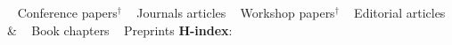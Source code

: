 


\setcounter{nC}{79}  %
\setcounter{nJ}{15}  %
\setcounter{nW}{33}  %
\setcounter{nBc}{5}  %
\setcounter{nE}{4}  %
\setcounter{nB}{2}  %
\setcounter{nP}{20}  %

\newcommand{\realcount}[1]{%
  \number\numexpr\value{#1}-1\relax%
}
\newcommand{\decvalue}[1]{%
  \addtocounter{#1}{-1}%
  \number\value{#1}%
}

\setcounter{tabc}{77}
\newcommand{\labelc}[1]{%
  \addtocounter{tabc}{-1}%
  \phantomsection       %
  \label{#1}%
}

\setcounter{tabw}{33}
\newcommand{\labelw}[1]{%
  \addtocounter{tabw}{-1}%
  \phantomsection       %
  \label{#1}%
}



\smallskip
\begin{keywords}
{			 \faAngleRight~ \nemph{\realcount{nC}} Conference papers$^{\dagger}$
\hspace{4pt} \faAngleRight~ \nemph{\realcount{nJ}} Journals articles
\hspace{4pt} \faAngleRight~ \nemph{\realcount{nW}} Workshop papers$^{\dagger}$
\hspace{4pt} \faAngleRight~ \nemph{\realcount{nE}} Editorial articles
		 \\& \faAngleRight~ \nemph{\realcount{nBc}} Book chapters
\hspace{4pt} \faAngleRight~ \nemph{\realcount{nP}} Preprints
}
{\citNo \hspace{8pt} 
 \textbf{H-index}: \hIndex \hspace{8pt} 
 }%
\end{keywords}

